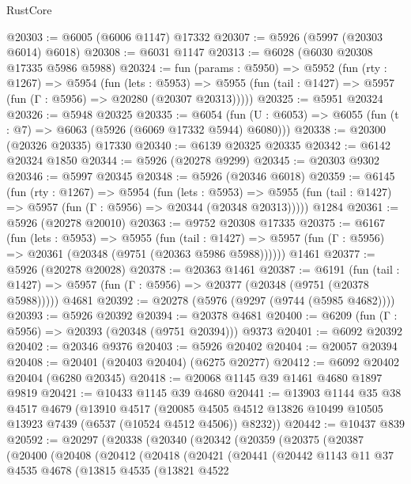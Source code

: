 \begin{lexlean}{RustCore}
\begin{coremodule}
@20303 := @6005 (@6006 @1147) @17332
@20307 := @5926 (@5997 (@20303 @6014) @6018)
@20308 := @6031 @1147
@20313 := @6028 (@6030 @20308 @17335 @5986 @5988)
@20324 := fun (params : @5950) =>
  @5952
    (fun (rty : @1267) =>
    @5954
      (fun (lets : @5953) =>
      @5955 (fun (tail : @1427) => @5957 (fun (Γ : @5956) => @20280 (@20307 @20313)))))
@20325 := @5951 @20324
@20326 := @5948 @20325
@20335 := @6054
    (fun (U : @6053) => @6055 (fun (t : @7) => @6063 (@5926 (@6069 @17332 @5944) @6080)))
@20338 := @20300 (@20326 @20335) @17330
@20340 := @6139 @20325 @20335
@20342 := @6142 @20324 @1850
@20344 := @5926 (@20278 @9299)
@20345 := @20303 @9302
@20346 := @5997 @20345
@20348 := @5926 (@20346 @6018)
@20359 := @6145
    (fun (rty : @1267) =>
    @5954
      (fun (lets : @5953) =>
      @5955 (fun (tail : @1427) => @5957 (fun (Γ : @5956) => @20344 (@20348 @20313)))))
    @1284
@20361 := @5926 (@20278 @20010)
@20363 := @9752 @20308 @17335
@20375 := @6167
    (fun (lets : @5953) =>
    @5955
      (fun (tail : @1427) =>
      @5957 (fun (Γ : @5956) => @20361 (@20348 (@9751 (@20363 @5986 @5988))))))
    @1461
@20377 := @5926 (@20278 @20028)
@20378 := @20363 @1461
@20387 := @6191
    (fun (tail : @1427) => @5957 (fun (Γ : @5956) => @20377 (@20348 (@9751 (@20378 @5988)))))
    @4681
@20392 := @20278 (@5976 (@9297 (@9744 (@5985 @4682))))
@20393 := @5926 @20392
@20394 := @20378 @4681
@20400 := @6209 (fun (Γ : @5956) => @20393 (@20348 (@9751 @20394))) @9373
@20401 := @6092 @20392
@20402 := @20346 @9376
@20403 := @5926 @20402
@20404 := @20057 @20394
@20408 := @20401 (@20403 @20404) (@6275 @20277)
@20412 := @6092 @20402 @20404 (@6280 @20345)
@20418 := @20068 @1145 @39 @1461 @4680 @1897 @9819
@20421 := @10433 @1145 @39 @4680
@20441 := @13903
    @1144
    @35
    @38
    @4517
    @4679
    (@13910
      @4517
      (@20085 @4505 @4512 @13826 @10499 @10505 @13923 @7439 (@6537 (@10524 @4512 @4506)) @8232))
@20442 := @10437 @839
@20592 := @20297
    (@20338
      (@20340
        (@20342
          (@20359
            (@20375
              (@20387
                (@20400
                  (@20408
                    (@20412
                      (@20418
                        (@20421
                          (@20441
                            (@20442
                              @1143
                              @11
                              @37
                              @4535
                              @4678
                              (@13815
                                @4535
                                (@13821
                                  @4522

\end{coremodule}
\end{lexlean}
